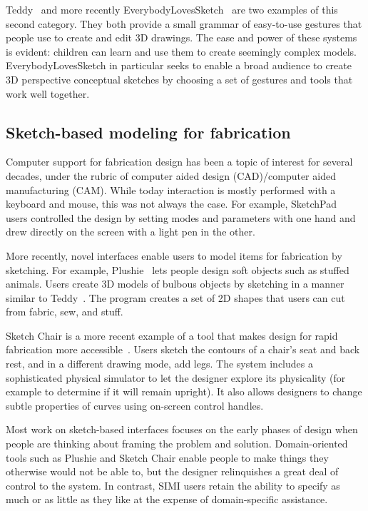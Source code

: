 \documentclass{article}
\begin{document}
Teddy~\cite{igarashi-teddy} and more recently
EverybodyLovesSketch~\cite{bae-everybody} are two examples of this
second category. They both provide a small grammar of easy-to-use
gestures that people use to create and edit 3D drawings. The ease and
power of these systems is evident: children can learn and use them to
create seemingly complex models. EverybodyLovesSketch in particular
seeks to enable a broad audience to create 3D perspective conceptual
sketches by choosing a set of gestures and tools that work well
together.


\subsection{Sketch-based modeling for fabrication}

Computer support for fabrication design has been a topic of interest
for several decades, under the rubric of computer aided design
(CAD)/computer aided manufacturing (CAM). While today interaction is
mostly performed with a keyboard and mouse, this was not always the
case. For example, SketchPad~\cite{sutherland-sketchpad} users
controlled the design by setting modes and parameters with one hand
and drew directly on the screen with a light pen in the other.

More recently, novel interfaces enable users to model items for
fabrication by sketching. For example, Plushie~\cite{mori-plushie}
lets people design soft objects such as stuffed animals. Users create
3D models of bulbous objects by sketching in a manner similar to
Teddy~\cite{igarashi-teddy}. The program creates a set of 2D shapes
that users can cut from fabric, sew, and stuff.

Sketch Chair is a more recent example of a tool that makes design for
rapid fabrication more accessible~\cite{saul-sketch-chair}. Users
sketch the contours of a chair's seat and back rest, and in a
different drawing mode, add legs. The system includes a sophisticated
physical simulator to let the designer explore its physicality (for
example to determine if it will remain upright). It also allows
designers to change subtle properties of curves using on-screen
control handles.

Most work on sketch-based interfaces focuses on the early phases of
design when people are thinking about framing the problem and
solution. Domain-oriented tools such as Plushie and Sketch Chair
enable people to make things they otherwise would not be able to, but
the designer relinquishes a great deal of control to the system. In
contrast, SIMI users retain the ability to specify as much or as
little as they like at the expense of domain-specific assistance.
\end{document}
